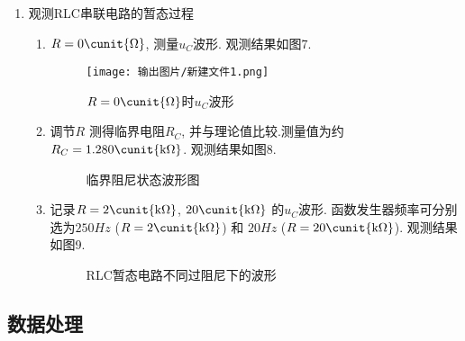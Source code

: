 \documentclass[11pt]{article}
\begin{document}
\begin{enumerate}
\begin{enumerate}
    \end{enumerate}
    \item 观测RLC串联电路的暂态过程

    \begin{enumerate}
    
    \item $R=0 \cunit{\Omega}$, 测量$u_C$波形. 观测结果如图7.
    
    \begin{figure}[H]
        \centering
        \texttt{[image: 输出图片/新建文件1.png]}
        \caption{$R=0 \cunit{\Omega}$时$u_C$波形}
    \end{figure}

    \item 调节$R$ 测得临界电阻$R_C$, 并与理论值比较.测量值为约$R_C=1.280\cunit{\mathrm{k}\Omega}$. 观测结果如图8.

    \begin{figure}[H]
        \centering
        \caption{临界阻尼状态波形图}
    \end{figure}

    \item 记录$R=2 \cunit{\mathrm{k}\Omega}$, $20 \cunit{\mathrm{k}\Omega}$ 的$u_C$波形. 函数发生器频率可分别选为$250 \unit{Hz}$ ($R=2 \cunit{\mathrm{k}\Omega}$) 和 $20 \unit{Hz}$ ($R=20 \cunit{\mathrm{k}\Omega}$). 观测结果如图9.
    
    \begin{figure}[H]
        \centering
        \caption{RLC暂态电路不同过阻尼下的波形}
    \end{figure}
    
    \end{enumerate}

\end{enumerate}

\subsection{数据处理}
\end{document}

